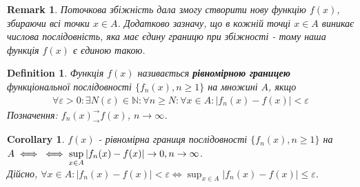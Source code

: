 \documentclass[a4paper, 10pt]{article}
\def\huge{\displaystyle}
\theoremstyle{theoremdd}
\theoremstyle{theoremdd}
\theoremstyle{theoremdd}
\newtheorem{definition}[theorem]{Definition}
\theoremstyle{theoremdd}
\theoremstyle{theoremdd}
\theoremstyle{theoremdd}
\theoremstyle{theoremdd}
\newtheorem{remark}[theorem]{Remark}
\theoremstyle{theoremdd}
\theoremstyle{theoremdd}
\newtheorem{corollary}[theorem]{Corollary}
\begin{document}

\begin{remark}
Поточкова збіжність дала змогу створити нову функцію $f(x)$, збираючи всі точки $x \in A$. Додатково зазначу, що в кожній точці $x \in A$ виникає числова послідовність, яка має єдину границю при збіжності - тому наша функція $f(x)$ є єдиною такою. 
\end{remark}

\begin{definition}
Функція $f(x)$ називається \textbf{рівномірною границею} функціональної послідовності $\{f_n(x), n \geq 1 \}$ на множині $A$, якщо
\begin{align*}
\forall \varepsilon > 0: \exists N(\varepsilon) \in \mathbb{N}: \forall n \geq N: \forall x \in A: |f_n(x)-f(x)| < \varepsilon
\end{align*}
Позначення: $f_n(x)^\rightarrow_\rightarrow f(x)$, $n \to \infty$.
\end{definition}

\begin{corollary}
$f(x)$ - рівномірна границя послідовності $\{f_n(x), n \geq 1\}$ на $A \iff \\ \iff \huge\sup_{x \in A} |f_n(x) - f(x)| \to 0, n \to \infty$.\\
\textit{Дійсно, $\forall x \in A: |f_n(x)-f(x)| < \varepsilon \iff \huge\sup_{x \in A} |f_n(x) - f(x)| \leq \varepsilon$}.
\end{corollary}
\end{document}
